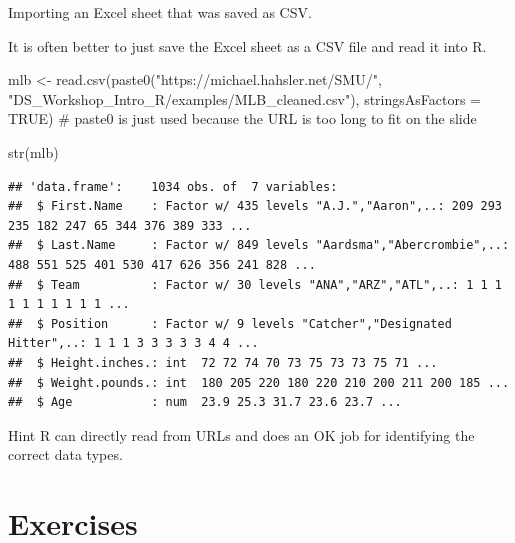 \documentclass[
  9pt,
  ignorenonframetext,
]{beamer}
\newenvironment{Shaded}{\begin{snugshade}}{\end{snugshade}}
\newcommand{\CommentTok}[1]{\textcolor[rgb]{0.50,0.62,0.50}{#1}}
\newcommand{\DataTypeTok}[1]{\textcolor[rgb]{0.87,0.87,0.75}{#1}}
\newcommand{\KeywordTok}[1]{\textcolor[rgb]{0.94,0.87,0.69}{#1}}
\newcommand{\NormalTok}[1]{\textcolor[rgb]{0.80,0.80,0.80}{#1}}
\newcommand{\OtherTok}[1]{\textcolor[rgb]{0.94,0.94,0.56}{#1}}
\newcommand{\StringTok}[1]{\textcolor[rgb]{0.80,0.58,0.58}{#1}}
\begin{document}
\begin{frame}[fragile]{Importing an Excel sheet that was saved as CSV.}
\protect\hypertarget{importing-an-excel-sheet-that-was-saved-as-csv.}{}
\small

It is often better to just save the Excel sheet as a CSV file and read
it into R.

\vfill

\begin{Shaded}
\begin{Highlighting}[]
\NormalTok{mlb \textless{}{-}}\StringTok{ }\KeywordTok{read.csv}\NormalTok{(}\KeywordTok{paste0}\NormalTok{(}\StringTok{"https://michael.hahsler.net/SMU/"}\NormalTok{,}
  \StringTok{"DS\_Workshop\_Intro\_R/examples/MLB\_cleaned.csv"}\NormalTok{), }\DataTypeTok{stringsAsFactors =} \OtherTok{TRUE}\NormalTok{)}
\CommentTok{\# paste0 is just used because the URL is too long to fit on the slide}

\KeywordTok{str}\NormalTok{(mlb)}
\end{Highlighting}
\end{Shaded}

\begin{verbatim}
## 'data.frame':    1034 obs. of  7 variables:
##  $ First.Name    : Factor w/ 435 levels "A.J.","Aaron",..: 209 293 235 182 247 65 344 376 389 333 ...
##  $ Last.Name     : Factor w/ 849 levels "Aardsma","Abercrombie",..: 488 551 525 401 530 417 626 356 241 828 ...
##  $ Team          : Factor w/ 30 levels "ANA","ARZ","ATL",..: 1 1 1 1 1 1 1 1 1 1 ...
##  $ Position      : Factor w/ 9 levels "Catcher","Designated Hitter",..: 1 1 1 3 3 3 3 3 4 4 ...
##  $ Height.inches.: int  72 72 74 70 73 75 73 73 75 71 ...
##  $ Weight.pounds.: int  180 205 220 180 220 210 200 211 200 185 ...
##  $ Age           : num  23.9 25.3 31.7 23.6 23.7 ...
\end{verbatim}

\vfill

\begin{block}{Hint}
\protect\hypertarget{hint}{}
R can directly read from URLs and does an OK job for identifying the
correct data types.
\end{block}
\end{frame}

\hypertarget{exercises}{%
\section{Exercises}\label{exercises}}
\end{document}
